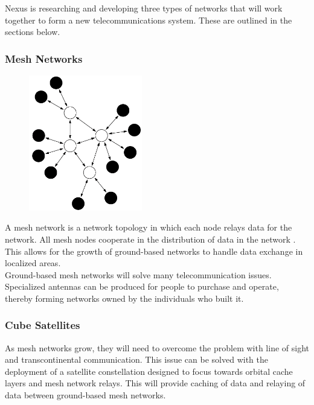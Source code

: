 \documentclass[11pt]{article}
\begin{document}
Nexus is researching and developing three types of networks that will work together to form a new telecommunications system. 
These are outlined in the sections below.

\subsubsection{Mesh Networks}

\begin{figure}
    \centering
    \vspace{-20pt}
    \includegraphics[width=0.44\textwidth]{mesh.png}
\end{figure}

A mesh network is a network topology in which each node relays data for the network. All mesh nodes cooperate in the distribution of data in the network \cite{meshnetworks}.\\ 

\noindent 
This allows for the growth of ground-based networks to handle data exchange in localized areas. \\

\noindent Ground-based mesh networks will solve many telecommunication issues.
Specialized antennas can be produced for people to purchase and operate, thereby forming networks owned by the individuals who built it.

\subsubsection{Cube Satellites}

As mesh networks grow, they will need to overcome the problem with line of sight and transcontinental communication. 
% 
% 
This issue can be solved with the deployment of a satellite constellation designed to focus towards orbital cache layers and mesh network relays. 
This will provide caching of data and relaying of data between ground-based mesh networks.
\end{document}
